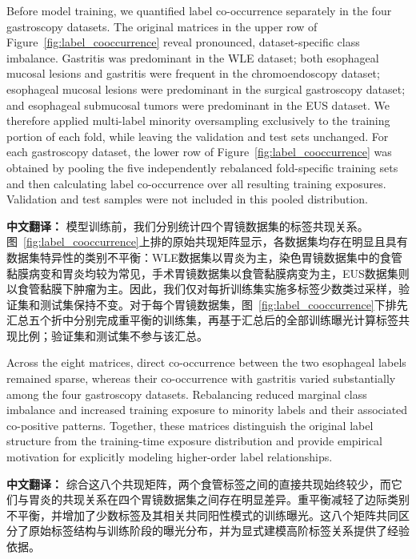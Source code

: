 \documentclass[Afour,sagev,times]{sagej}
\begin{document}
Before model training, we quantified label co-occurrence separately in the four gastroscopy datasets. The original matrices in the upper row of Figure~\ref{fig:label_cooccurrence} reveal pronounced, dataset-specific class imbalance. Gastritis was predominant in the WLE dataset; both esophageal mucosal lesions and gastritis were frequent in the chromoendoscopy dataset; esophageal mucosal lesions were predominant in the surgical gastroscopy dataset; and esophageal submucosal tumors were predominant in the EUS dataset. We therefore applied multi-label minority oversampling exclusively to the training portion of each fold, while leaving the validation and test sets unchanged. For each gastroscopy dataset, the lower row of Figure~\ref{fig:label_cooccurrence} was obtained by pooling the five independently rebalanced fold-specific training sets and then calculating label co-occurrence over all resulting training exposures. Validation and test samples were not included in this pooled distribution.

\textbf{中文翻译：} 模型训练前，我们分别统计四个胃镜数据集的标签共现关系。图~\ref{fig:label_cooccurrence}上排的原始共现矩阵显示，各数据集均存在明显且具有数据集特异性的类别不平衡：WLE数据集以胃炎为主，染色胃镜数据集中的食管黏膜病变和胃炎均较为常见，手术胃镜数据集以食管黏膜病变为主，EUS数据集则以食管黏膜下肿瘤为主。因此，我们仅对每折训练集实施多标签少数类过采样，验证集和测试集保持不变。对于每个胃镜数据集，图~\ref{fig:label_cooccurrence}下排先汇总五个折中分别完成重平衡的训练集，再基于汇总后的全部训练曝光计算标签共现比例；验证集和测试集不参与该汇总。

Across the eight matrices, direct co-occurrence between the two esophageal labels remained sparse, whereas their co-occurrence with gastritis varied substantially among the four gastroscopy datasets. Rebalancing reduced marginal class imbalance and increased training exposure to minority labels and their associated co-positive patterns. Together, these matrices distinguish the original label structure from the training-time exposure distribution and provide empirical motivation for explicitly modeling higher-order label relationships.

\textbf{中文翻译：} 综合这八个共现矩阵，两个食管标签之间的直接共现始终较少，而它们与胃炎的共现关系在四个胃镜数据集之间存在明显差异。重平衡减轻了边际类别不平衡，并增加了少数标签及其相关共同阳性模式的训练曝光。这八个矩阵共同区分了原始标签结构与训练阶段的曝光分布，并为显式建模高阶标签关系提供了经验依据。
\end{document}
